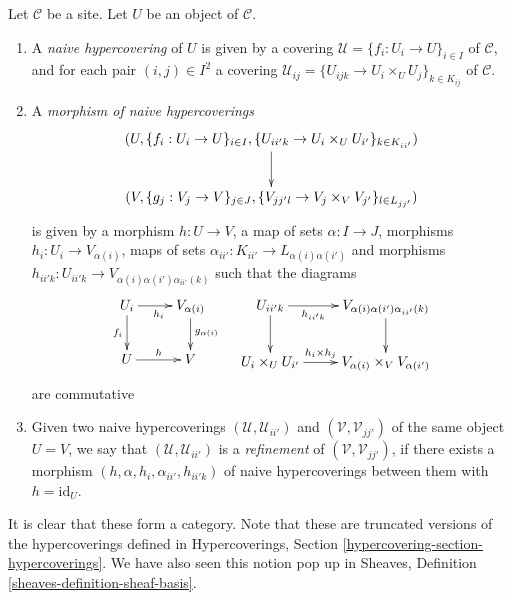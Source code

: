 \begin{definition}
\label{definition-naive-hypercovering}
Let $\mathcal{C}$ be a site. Let $U$ be an object of $\mathcal{C}$.
\begin{enumerate}
\item A {\it naive hypercovering} of $U$ is given by a
covering $\mathcal{U} = \{f_i : U_i \to U\}_{i \in I}$ of $\mathcal{C}$,
and for each pair $(i, j) \in I^2$ a covering
$\mathcal{U}_{ij} = \{U_{ijk} \to U_i \times_U U_j\}_{k \in K_{ij}}$
of $\mathcal{C}$.
\item A {\it morphism of naive hypercoverings}
$$
\xymatrix{
(U, \{f_i : U_i \to U\}_{i \in I},
\{U_{ii'k} \to U_i \times_U U_{i'}\}_{k \in K_{ii'}})
\ar[d] \\
(V, \{g_j : V_j \to V\}_{j \in J},
\{V_{jj'l} \to V_j \times_V V_{j'}\}_{l \in L_{jj'}})
}
$$
is given by a morphism $h : U \to V$, a map of sets
$\alpha : I \to J$, morphisms $h_i : U_i \to V_{\alpha(i)}$,
maps of sets $\alpha_{ii'} : K_{ii'} \to L_{\alpha(i)\alpha(i')}$
and morphisms
$h_{ii'k} : U_{ii'k} \to V_{\alpha(i)\alpha(i')\alpha_{ii'}(k)}$
such that the diagrams
$$
\xymatrix{
U_i \ar[r]_{h_i} \ar[d]_{f_i} & V_{\alpha(i)} \ar[d]^{g_{\alpha(i)}} \\
U \ar[r]^h & V
}
\quad
\xymatrix{
U_{ii'k} \ar[r]_-{h_{ii'k}} \ar[d] &
V_{\alpha(i)\alpha(i')\alpha_{ii'}(k)} \ar[d] \\
U_i \times_U U_{i'} \ar[r]^-{h_i \times h_j} &
V_{\alpha(i)} \times_V V_{\alpha(i')}
}
$$
are commutative
\item Given two naive hypercoverings
$(\mathcal{U}, \mathcal{U}_{ii'})$ and $(\mathcal{V}, \mathcal{V}_{jj'})$
of the same object $U = V$, we say that $(\mathcal{U}, \mathcal{U}_{ii'})$
is a {\it refinement} of $(\mathcal{V}, \mathcal{V}_{jj'})$, if there exists
a morphism $(h, \alpha, h_i, \alpha_{ii'}, h_{ii'k})$
of naive hypercoverings between them with $h = \text{id}_U$.
\end{enumerate}
\end{definition}

\noindent
It is clear that these form a category. Note that these are truncated
versions of the hypercoverings defined in
Hypercoverings, Section \ref{hypercovering-section-hypercoverings}.
We have also seen this notion pop up in
Sheaves, Definition \ref{sheaves-definition-sheaf-basis}.

